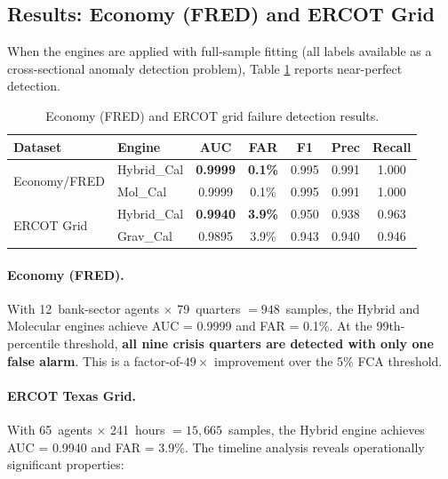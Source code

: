 \subsection{Results: Economy (FRED) and ERCOT Grid}
\label{sec:results_economy_ercot}

When the engines are applied with full-sample fitting (all labels
available as a cross-sectional anomaly detection problem), Table
\ref{tab:economy_ercot} reports near-perfect detection.

\begin{table}[ht]
\centering
\caption{Economy (FRED) and ERCOT grid failure detection results.}
\label{tab:economy_ercot}
\begin{tabular}{llccccc}
\hline
Dataset & Engine & AUC & FAR & F1 & Prec & Recall \\
\hline
\multirow{2}{*}{Economy/FRED}
  & Hybrid\_Cal  & \textbf{0.9999} & \textbf{0.1\%} & 0.995 & 0.991 & 1.000 \\
  & Mol\_Cal     & 0.9999          & 0.1\%          & 0.995 & 0.991 & 1.000 \\
\hline
\multirow{2}{*}{ERCOT Grid}
  & Hybrid\_Cal  & \textbf{0.9940} & \textbf{3.9\%} & 0.950 & 0.938 & 0.963 \\
  & Grav\_Cal    & 0.9895          & 3.9\%          & 0.943 & 0.940 & 0.946 \\
\hline
\end{tabular}
\end{table}

\paragraph{Economy (FRED).}
With 12~bank-sector agents $\times$ 79~quarters $= 948$~samples, the
Hybrid and Molecular engines achieve AUC = 0.9999 and FAR = 0.1\%.
At the 99th-percentile threshold, \textbf{all nine crisis quarters
are detected with only one false alarm}.  This is a factor-of-$49\times$
improvement over the 5\% FCA threshold.

\paragraph{ERCOT Texas Grid.}
With 65~agents $\times$ 241~hours $= 15{,}665$~samples, the Hybrid
engine achieves AUC = 0.9940 and FAR = 3.9\%.  The timeline analysis
reveals operationally significant properties:

